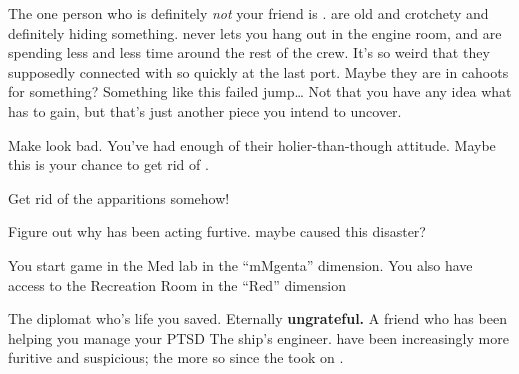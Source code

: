 \documentclass[char]{TMFHope}
\begin{document}
The one person who is definitely \emph{not} your friend is \cEng{}. \cEng{\They} are old and crotchety and definitely hiding something. \cEng{} never lets you hang out in the engine room, and \cEng{\they} are spending less and less time around the rest of the crew. It's so weird that they supposedly connected with \cBoy{} so quickly at the last port. Maybe they are in cahoots for something? Something like this failed jump\ldots{} Not that you have any idea what \cEng{} has to gain, but that's just another piece you intend to uncover.



\begin{itemz}[Goals]
	\item Make \cDip{} look bad. You've had enough of their holier-than-though attitude. Maybe this is your chance to get rid of \cDip{\them}.
	\item Get rid of the apparitions somehow!
	\item Figure out why \cEng{} has been acting furtive. maybe \cEng{\they} caused this disaster?
\end{itemz}

\begin{itemz}[Notes]
	\item You start game in the Med lab in the ``mMgenta'' dimension. You also have access to the Recreation Room in the ``Red'' dimension
\end{itemz}

\begin{contacts}
	\contact{\cDip{}} The diplomat who's life you saved. Eternally {\bf ungrateful.}
	\contact{\cNav{}} A friend who has been helping you manage your PTSD
	\contact{\cEng{}} The ship's engineer. \cEng{\They} have been increasingly more furitive and suspicious; the more so since the \pNew{} took on \cBoy{}.
\end{contacts}
\end{document}
